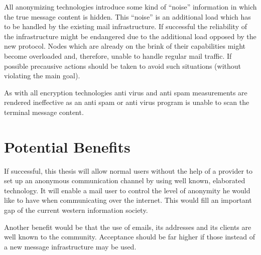 \documentclass[twocolumn,a4paper,10pt,english]{scrartcl}
\begin{document}
All anonymizing technologies introduce some kind of ``noise'' information in which the true message content is hidden. This ``noise'' is an additional load which has to be handled by the existing mail infrastructure. If successful the reliability of the infrastructure might be endangered due to the additional load opposed by the new protocol. Nodes which are already on the brink of their capabilities might become overloaded and, therefore, unable to handle regular mail traffic. If possible precausive actions should be taken to avoid such situations (without violating the main goal).\par

As with all encryption technologies anti virus and anti spam measurements are rendered ineffective as an anti spam or anti virus program is unable to scan the terminal message content.\par

\section{Potential Benefits}
If successful, this thesis will allow normal users without the help of a provider to set up an anonymous communication channel by using well known, elaborated technology. It will enable a mail user to control the level of anonymity he would like to have when communicating over the internet. This would fill an important gap of the current western information society. \par

Another benefit would be that the use of emails, its addresses and its clients are well known to the community. Acceptance should be far higher if those instead of a new message infrastructure may be used.\par
\end{document}
